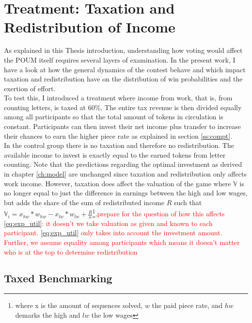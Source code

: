     
    \section{Treatment: Taxation and Redistribution of Income}
    \label{sec:treat}
    
    As explained in this Thesis introduction, understanding how voting would affect the POUM itself requires several layers of examination. In the present work, I have a look at how the general dynamics of the contest behave and which impact taxation and redistribution have on the distribution of win probabilities and the exertion of effort.\\
    
    To test this, I introduced a treatment where income from work, that is, from counting letters, is taxed at 60\%. The entire tax revenue is then divided equally among all participants so that the total amount of tokens in circulation is constant. Participants can then invest their net income plus transfer to increase their chances to earn the higher piece rate as explained in section \ref{ss:compt}.\\
    
    In the control group there is no taxation and therefore no redistribution. The available income to invest is exactly equal to the earned tokens from letter counting. Note that the predictions regarding the optimal investment as derived in chapter \ref{ch:model} are unchanged since taxation and redistribution only affects work income. However, taxation does affect the valuation of the game where $\mathbb{V}$ is no longer equal to just the difference in earnings between the high and low wages, but adds the share of the sum of redistributed income $R$ such that $\mathbb{V}_i = x_{hw}*w_{hw} - x_{lw}*w_{lw} + \frac{R}{n}$\footnote{where x is the amount of sequences solved, $w$ the paid piece rate, and $hw$ demarks the high and $lw$ the low wages}.\textcolor{red}{prepare for the question of how this affects \ref{eq:exp_util}: it doesn't we take valuation as given and known to each participant. \ref{eq:exp_util} only takes into account the investment amount. Further, we assume equality among participants which means it doesn't matter who is at the top to determine redistribution}  
    
    \subsection{Taxed Benchmarking}
    \label{ss:tax_bench}
    
